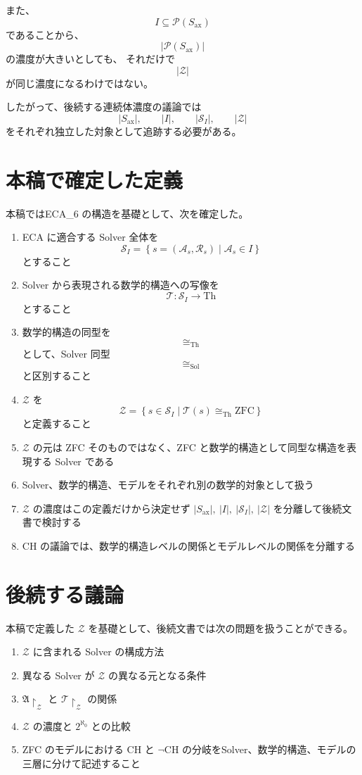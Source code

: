 \documentclass[a4paper,11pt]{article}
\newcommand{\Solver}{\mathcal{S}}
\newcommand{\Ax}{S_{\mathrm{ax}}}
\newcommand{\Th}{\mathrm{Th}}
\begin{document}
また、
\[
I\subseteq\mathcal{P}(\Ax)
\]
であることから、
\[
|\mathcal{P}(\Ax)|
\]
の濃度が大きいとしても、
それだけで
\[
|\mathcal{Z}|
\]
が同じ濃度になるわけではない。

したがって、後続する連続体濃度の議論では
\[
|\Ax|,
\qquad
|I|,
\qquad
|\Solver_I|,
\qquad
|\mathcal{Z}|
\]
をそれぞれ独立した対象として追跡する必要がある。

\section{本稿で確定した定義}

本稿ではECA_6 の構造を基礎として、次を確定した。

\begin{enumerate}
\item ECA に適合する Solver 全体を
\[
\Solver_I
=
\left\{
s=(\mathcal{A}_s,\mathcal{R}_s)
\mid
\mathcal{A}_s\in I
\right\}
\]
とすること

\item Solver から表現される数学的構造への写像を
\[
\mathcal{T}:\Solver_I\to\Th
\]
とすること

\item 数学的構造の同型を
\[
\cong_{\mathrm{Th}}
\]
として、Solver 同型
\[
\cong_{\mathrm{Sol}}
\]
と区別すること

\item $\mathcal{Z}$ を
\[
\boxed{
\mathcal{Z}
=
\left\{
s\in\Solver_I
\mid
\mathcal{T}(s)\cong_{\mathrm{Th}}\mathrm{ZFC}
\right\}
}
\]
と定義すること

\item $\mathcal{Z}$ の元は ZFC そのものではなく、ZFC と数学的構造として同型な構造を表現する Solver である
\item Solver、数学的構造、モデルをそれぞれ別の数学的対象として扱う
\item $\mathcal{Z}$ の濃度はこの定義だけから決定せず $|\Ax|,\ |I|,\ |\Solver_I|,\ |\mathcal{Z}|$ を分離して後続文書で検討する
\item CH の議論では、数学的構造レベルの関係とモデルレベルの関係を分離する
\end{enumerate}

\section{後続する議論}

本稿で定義した $\mathcal{Z}$ を基礎として、後続文書では次の問題を扱うことができる。

\begin{enumerate}
\item $\mathcal{Z}$ に含まれる Solver の構成方法
\item 異なる Solver が $\mathcal{Z}$ の異なる元となる条件
\item $\mathfrak{A}\restriction_{\mathcal{Z}}$ と $\mathcal{T}\restriction_{\mathcal{Z}}$ の関係
\item $\mathcal{Z}$ の濃度と $2^{\aleph_0}$ との比較
\item ZFC のモデルにおける CH と $\neg\mathrm{CH}$ の分岐をSolver、数学的構造、モデルの三層に分けて記述すること
\end{enumerate}
\end{document}
